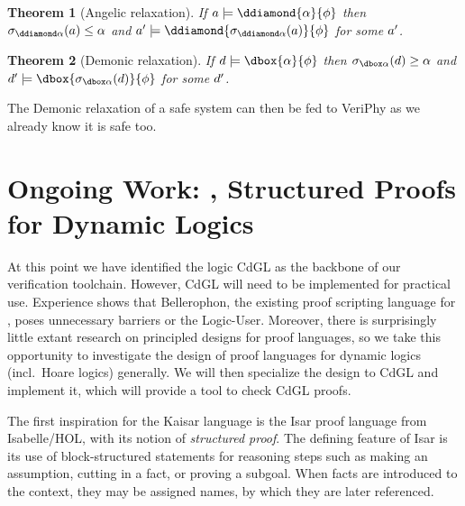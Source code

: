 \documentclass[12pt]{cmuthesis}
\newtheorem{theorem}{Theorem}
\theoremstyle{definition}
\theoremstyle{remark}
\newcommand{\CdGL}{\textsf{CdGL}\xspace}
\newcommand{\VeriPhy}{VeriPhy\xspace}
\begin{document}
\begin{theorem}[Angelic relaxation]
  If $\aa \models \ddiamond{\alpha}{\phi}$ then $\ainline{\alpha}{\aa} \leq \alpha$ and $\aa' \models \ddiamond{\ainline{\alpha}{\aa}}{\phi}$ for some $\aa'$.
\end{theorem}
\begin{theorem}[Demonic relaxation]
  If $\da \models \dbox{\alpha}{\phi}$ then $\dinline{\alpha}{\da} \geq \alpha$ and $\da' \models \dbox{\dinline{\alpha}{\da}}{\phi}$ for some $\da'$.
\end{theorem}

The Demonic relaxation of a safe system can then be fed to \VeriPhy as we already know it is safe too.


\chapter{Ongoing Work: \Kaisar, Structured Proofs for Dynamic Logics}
\label{ch:kaisar}
At this point we have identified the logic \CdGL as the backbone of our verification toolchain.
However, \CdGL will need to be implemented for practical use.
Experience shows that Bellerophon, the existing proof scripting language for \dGL, poses unnecessary barriers or the Logic-User.
Moreover, there is surprisingly little extant research on principled designs for proof languages, so we take this opportunity to investigate the design of proof languages for dynamic logics (incl.\ Hoare logics) generally.
We will then specialize the design to \CdGL and implement it, which will provide a tool to check \CdGL proofs.

The first inspiration for the Kaisar language is the Isar proof language from Isabelle/HOL, with its notion of \emph{structured proof}.
The defining feature of Isar is its use of block-structured statements for reasoning steps such as making an assumption, cutting in a fact, or proving a subgoal.
When facts are introduced to the context, they may be assigned names, by which they are later referenced.
\end{document}
